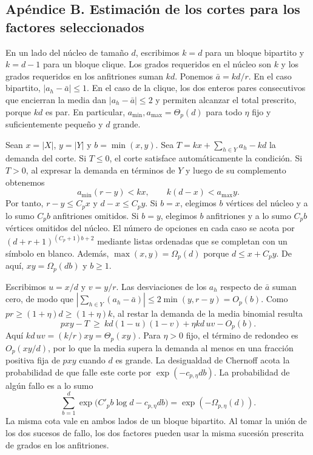 \documentclass[spanish,11pt,a4paper]{article}
\begin{document}
\subsection{Apéndice B. Estimación de los cortes para los factores seleccionados}\label{apuxe9ndice-b.-estimaciuxf3n-de-los-cortes-para-los-factores-seleccionados}

En un lado del núcleo de tamaño \(d\), escribimos \(k=d\) para un bloque bipartito y \(k=d-1\) para un bloque clique. Los grados requeridos en el núcleo son \(k\) y los grados requeridos en los anfitriones suman \(kd\). Ponemos \(\bar a=kd/r\). En el caso bipartito, \(|a_h-\bar a|\le1\). En el caso de la clique, los dos enteros pares consecutivos que encierran la media dan \(|a_h-\bar a|\le2\) y permiten alcanzar el total prescrito, porque \(kd\) es par. En particular, \(a_{\min},a_{\max}=\Theta_p(d)\) para todo \(\eta\) fijo y suficientemente pequeño y \(d\) grande.

Sean \(x=|X|\), \(y=|Y|\) y \(b=\min(x,y)\). Sea \(T=kx+\sum_{h\in Y}a_h-kd\) la demanda del corte. Si \(T\le0\), el corte satisface automáticamente la condición. Si \(T>0\), al expresar la demanda en términos de \(Y\) y luego de su complemento obtenemos \[a_{\min}(r-y)<kx,\qquad k(d-x)<a_{\max}y .\] Por tanto, \(r-y\le C_px\) y \(d-x\le C_py\). Si \(b=x\), elegimos \(b\) vértices del núcleo y a lo sumo \(C_pb\) anfitriones omitidos. Si \(b=y\), elegimos \(b\) anfitriones y a lo sumo \(C_pb\) vértices omitidos del núcleo. El número de opciones en cada caso se acota por \((d+r+1)^{(C_p+1)b+2}\) mediante listas ordenadas que se completan con un símbolo en blanco. Además, \(\max(x,y)=\Omega_p(d)\) porque \(d\le x+C_py\). De aquí, \(xy=\Omega_p(db)\) y \(b\ge1\).

Escribimos \(u=x/d\) y \(v=y/r\). Las desviaciones de los \(a_h\) respecto de \(\bar a\) suman cero, de modo que \(|\sum_{h\in Y}(a_h-\bar a)|\le2\min(y,r-y)=O_p(b)\). Como \(pr\ge(1+\eta)d\ge(1+\eta)k\), al restar la demanda de la media binomial resulta \[pxy-T\ \ge\ kd(1-u)(1-v)+\eta kd\,uv-O_p(b).\] Aquí \(kd\,uv=(k/r)xy=\Theta_p(xy)\). Para \(\eta>0\) fijo, el término de redondeo es \(O_p(xy/d)\), por lo que la media supera la demanda al menos en una fracción positiva fija de \(pxy\) cuando \(d\) es grande. La desigualdad de Chernoff acota la probabilidad de que falle este corte por \(\exp(-c_{p,\eta}db)\). La probabilidad de algún fallo es a lo sumo \[\sum_{b=1}^{d}\exp\big(C'_pb\log d-c_{p,\eta}db\big)
       =\exp(-\Omega_{p,\eta}(d)).\] La misma cota vale en ambos lados de un bloque bipartito. Al tomar la unión de los dos sucesos de fallo, los dos factores pueden usar la misma sucesión prescrita de grados en los anfitriones.
\end{document}
